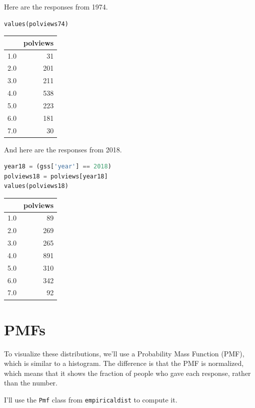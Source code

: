 Here are the responses from 1974.

\begin{lstlisting}[language=Python,style=source]
values(polviews74)
\end{lstlisting}

\begin{tabular}{lr}
\toprule
{} &  polviews \\
\midrule
1.0 &        31 \\
2.0 &       201 \\
3.0 &       211 \\
4.0 &       538 \\
5.0 &       223 \\
6.0 &       181 \\
7.0 &        30 \\
\bottomrule
\end{tabular}

And here are the responses from 2018.

\begin{lstlisting}[language=Python,style=source]
year18 = (gss['year'] == 2018)
polviews18 = polviews[year18]
values(polviews18)
\end{lstlisting}

\begin{tabular}{lr}
\toprule
{} &  polviews \\
\midrule
1.0 &        89 \\
2.0 &       269 \\
3.0 &       265 \\
4.0 &       891 \\
5.0 &       310 \\
6.0 &       342 \\
7.0 &        92 \\
\bottomrule
\end{tabular}

\hypertarget{pmfs}{%
\section{PMFs}\label{pmfs}}

To visualize these distributions, we'll use a Probability Mass Function
(PMF), which is similar to a histogram. The difference is that the PMF
is normalized, which means that it shows the fraction of people who gave
each response, rather than the number.

I'll use the \passthrough{\lstinline!Pmf!} class from
\passthrough{\lstinline!empiricaldist!} to compute it.


